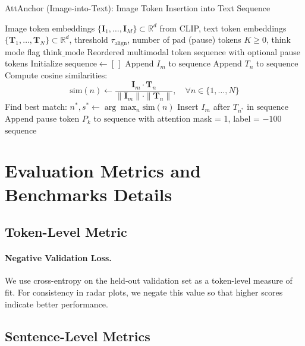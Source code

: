 \documentclass[11pt]{article}
\begin{document}
\begin{algorithm}[H]
\caption{AttAnchor (Image-into-Text): Image Token Insertion into Text Sequence}
\label{alg:image_into_text}
\begin{algorithmic}[1]
\Require Image token embeddings $\{\mathbf{I}_1, \dots, \mathbf{I}_M\} \subset \mathbb{R}^d$ from CLIP, text token embeddings $\{\mathbf{T}_1, \dots, \mathbf{T}_N\} \subset \mathbb{R}^d$, threshold $\tau_{\text{align}}$, number of pad (pause) tokens $K \geq 0$, think mode flag $\text{think\_mode}$
\Ensure Reordered multimodal token sequence with optional pause tokens
\State Initialize $\text{sequence} \gets [\,]$
    \State Append $I_m$ to $\text{sequence}$
\EndFor
{}
    \State Append $T_n$ to $\text{sequence}$
\EndFor
{}
    \State Compute cosine similarities: 
    \[
        \text{sim}(n) \gets \frac{\mathbf{I}_m \cdot \mathbf{T}_n}{\|\mathbf{I}_m\| \cdot \|\mathbf{T}_n\|}, \quad \forall n \in \{1, \dots, N\}
    \]
    \State Find best match: $n^*, s^* \gets \arg\max_{n} \text{sim}(n)$
        \State Insert $I_m$ after $T_{n^*}$ in $\text{sequence}$
    \EndIf
\EndFor
{}
        \State Append pause token $P_k$ to $\text{sequence}$ with attention mask = 1, label = $-100$
    \EndFor
\EndIf
\State \Return $\text{sequence}$
\end{algorithmic}
\end{algorithm}

\section{Evaluation Metrics and Benchmarks Details}
\label{app:eval_metrics}

\subsection{Token-Level Metric}
\paragraph{Negative Validation Loss.}
We use cross-entropy on the held-out validation set as a token-level measure of fit. For consistency in radar plots, we negate this value so that higher scores indicate better performance.

\subsection{Sentence-Level Metrics}
\end{document}

